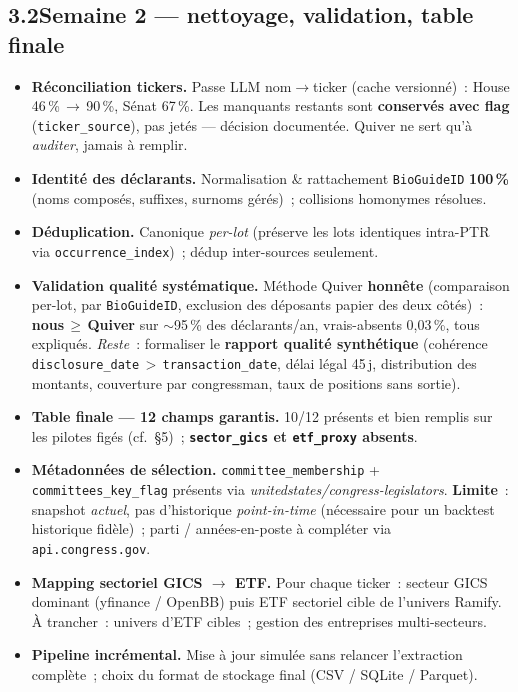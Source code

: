 \documentclass[11pt,a4paper]{article}
\newcommand{\file}[1]{\texttt{\small #1}}
\newcommand{\nb}[1]{\textbf{#1}}
\newcommand{\badge}[2]{\colorbox{#1}{\textcolor{white}{\scriptsize\textbf{\,#2\,}}}}
\newcommand{\FAIT}{\badge{okgreen}{FAIT}}
\newcommand{\ENCOURS}{\badge{warn}{EN COURS}}
\newcommand{\AFAIRE}{\badge{todo}{\`A FAIRE}}
\begin{document}
\subsection*{3.2\quad Semaine 2 --- nettoyage, validation, table finale}

\begin{itemize}
\item[\ENCOURS] \textbf{R\'econciliation tickers.} Passe LLM nom$\to$ticker (cache versionn\'e)~:
House 46\,\%\,$\to$\,90\,\%, S\'enat 67\,\%. Les manquants restants sont \nb{conserv\'es avec flag}
(\file{ticker\_source}), pas jet\'es --- d\'ecision document\'ee. Quiver ne sert qu'\`a \emph{auditer},
jamais \`a remplir.
\item[\FAIT] \textbf{Identit\'e des d\'eclarants.} Normalisation \& rattachement \file{BioGuideID}
\nb{100\,\%} (noms compos\'es, suffixes, surnoms g\'er\'es)~; collisions homonymes r\'esolues.
\item[\FAIT] \textbf{D\'eduplication.} Canonique \emph{per-lot} (pr\'eserve les lots identiques
intra-PTR via \file{occurrence\_index})~; d\'edup inter-sources seulement.
\item[\ENCOURS] \textbf{Validation qualit\'e systématique.} M\'ethode Quiver \nb{honn\^ete}
(comparaison per-lot, par \file{BioGuideID}, exclusion des d\'eposants papier des deux c\^ot\'es)~:
\nb{nous\,$\geq$\,Quiver} sur $\sim$95\,\% des d\'eclarants/an, vrais-absents 0,03\,\%, tous
expliqu\'es. \textit{Reste}~: formaliser le \nb{rapport qualit\'e synth\'etique} (coh\'erence
\file{disclosure\_date}\,$>$\,\file{transaction\_date}, d\'elai l\'egal 45\,j, distribution des
montants, couverture par congressman, taux de positions sans sortie).
\item[\ENCOURS] \textbf{Table finale --- 12 champs garantis.} 10/12 pr\'esents et bien remplis sur
les pilotes figés (cf.~\S5)~; \nb{\file{sector\_gics} et \file{etf\_proxy} absents}.
\item[\ENCOURS] \textbf{M\'etadonn\'ees de s\'election.} \file{committee\_membership} +
\file{committees\_key\_flag} pr\'esents via \emph{unitedstates/congress-legislators}. \nb{Limite}~:
snapshot \emph{actuel}, pas d'historique \emph{point-in-time} (n\'ecessaire pour un backtest
historique fid\`ele)~; parti / ann\'ees-en-poste \`a compl\'eter via \file{api.congress.gov}.
\item[\AFAIRE] \textbf{Mapping sectoriel GICS $\to$ ETF.} Pour chaque ticker~: secteur GICS dominant
(yfinance / OpenBB) puis ETF sectoriel cible de l'univers Ramify. \`A trancher~: univers d'ETF
cibles~; gestion des entreprises multi-secteurs.
\item[\AFAIRE] \textbf{Pipeline incr\'emental.} Mise \`a jour simul\'ee sans relancer l'extraction
compl\`ete~; choix du format de stockage final (CSV / SQLite / Parquet).
\end{itemize}
\end{document}
